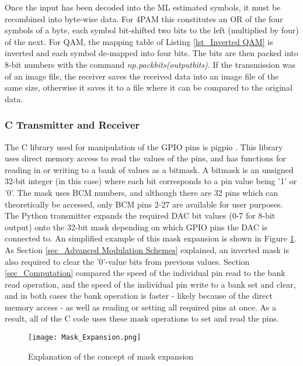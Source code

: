 \documentclass[../main.tex]{subfiles}
\begin{document}
Once the input has been decoded into the ML estimated symbols, it must be recombined into byte-wise data.
For 4PAM this constitutes an OR of the four symbols of a byte, each symbol bit-shifted two bits to the left (multiplied by four) of the next.
For QAM, the mapping table of Listing \ref{lst_Inverted QAM} is inverted and each symbol de-mapped into four bits.
The bits are then packed into 8-bit numbers with the command \textit{np.packbits(output\textunderscore bits)}.
If the transmission was of an image file, the receiver saves the received data into an image file of the same size, otherwise it saves it to a file where it can be compared to the original data.



\subsubsection{C Transmitter and Receiver} \label{sec_C Transmitter and Receiver}

The C library used for manipulation of the GPIO pins is pigpio \cite{lib_pigpio}.
This library uses direct memory access to read the values of the pins, and has functions for reading in or writing to a bank of values as a bitmask.
A bitmask is an unsigned 32-bit integer (in this case) where each bit corresponds to a pin value being '1' or '0'.
The mask uses BCM numbers, and although there are 32 pins which can theoretically be accessed, only BCM pins 2-27 are available for user purposes.
The Python transmitter expands the required DAC bit values (0-7 for 8-bit output) onto the 32-bit mask depending on which GPIO pins the DAC is connected to.
An simplified example of this mask expansion is shown in Figure \ref{fig_Mask Expansion}.
As Section \ref{sec_Advanced Modulation Schemes} explained, an inverted mask is also required to clear the '0'-value bits from previous values.
Section \ref{sec_Computation} compared the speed of the individual pin read to the bank read operation, and the speed of the individual pin write to a bank set and clear, and in both cases the bank operation is faster - likely because of the direct memory access - as well as reading or setting all required pins at once.
As a result, all of the C code uses these mask operations to set and read the pins.\\

\begin{figure}[ht]
 	\centering
 	\texttt{[image: Mask\_Expansion.png]}
 	\caption{Explanation of the concept of mask expansion}
 	\label{fig_Mask Expansion}
\end{figure}
\end{document}
